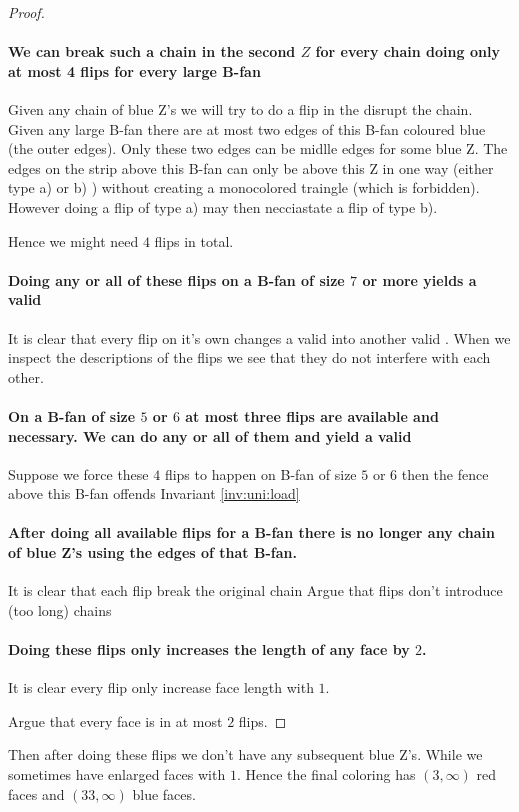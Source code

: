 \begin{proof}
  \paragraph{We can break such a chain in the second $Z$ for every chain doing only at most 4 flips for every large B-fan}
  Given any chain of blue Z's we will try to do a flip in the disrupt the chain. Given any large B-fan there are at most two edges of this B-fan coloured blue (the outer edges). Only these two edges can be midlle edges for some blue Z. The edges on the strip above this B-fan can only be above this Z in one way (either type a) or b) ) without creating a monocolored traingle (which is forbidden). However doing a flip of type a) may then necciastate a flip of type b).

  Hence we might need $4$ flips in total.

  \paragraph{Doing any or all of these flips on a B-fan of size $7$ or more yields a valid \rel}
  It is clear that every flip on it's own changes a valid \rel into another valid \rel.
  When we inspect the descriptions of the flips we see that they do not interfere with each other.

  \paragraph{On a B-fan of size $5$ or $6$ at most three flips are available and necessary. We can do any or all of them and yield a valid \rel}

  Suppose we force these $4$ flips to happen on B-fan of size $5$ or $6$ then the fence above this B-fan offends Invariant \ref{inv:uni:load}


  \paragraph{After doing all available flips for a B-fan there is no longer any chain of blue Z's using the edges of that B-fan.}
  It is clear that each flip break the original chain
  Argue that flips don't introduce (too long) chains

  \paragraph{Doing these flips only increases the length of any face by $2$.}
  It is clear every flip only increase face length with $1$.

  Argue that every face is in at most $2$ flips.



\end{proof}


Then after doing these flips we don't have any subsequent blue Z's. While we sometimes have enlarged faces with $1$.  Hence the final coloring has $(3, \infty)$ red faces and $(33, \infty)$ blue faces.
